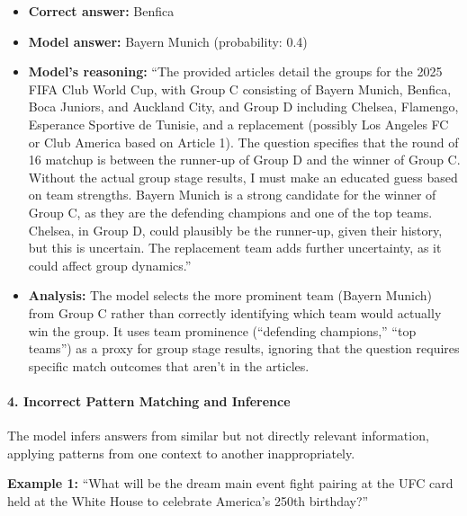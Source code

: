 \begin{itemize}
\item \textbf{Correct answer:} Benfica
\item \textbf{Model answer:} Bayern Munich (probability: 0.4)
\item \textbf{Model's reasoning:} ``The provided articles detail the groups for the 2025 FIFA Club World Cup, with Group C consisting of Bayern Munich, Benfica, Boca Juniors, and Auckland City, and Group D including Chelsea, Flamengo, Esperance Sportive de Tunisie, and a replacement (possibly Los Angeles FC or Club America based on Article 1). The question specifies that the round of 16 matchup is between the runner-up of Group D and the winner of Group C. Without the actual group stage results, I must make an educated guess based on team strengths. Bayern Munich is a strong candidate for the winner of Group C, as they are the defending champions and one of the top teams. Chelsea, in Group D, could plausibly be the runner-up, given their history, but this is uncertain. The replacement team adds further uncertainty, as it could affect group dynamics.''
\item \textbf{Analysis:} The model selects the more prominent team (Bayern Munich) from Group C rather than correctly identifying which team would actually win the group. It uses team prominence (``defending champions,'' ``top teams'') as a proxy for group stage results, ignoring that the question requires specific match outcomes that aren't in the articles.
\end{itemize}

\iffalse 
\paragraph{4. Incorrect Pattern Matching and Inference}

The model infers answers from similar but not directly relevant information, applying patterns from one context to another inappropriately.

\textbf{Example 1:} ``What will be the dream main event fight pairing at the UFC card held at the White House to celebrate America's 250th birthday?''

